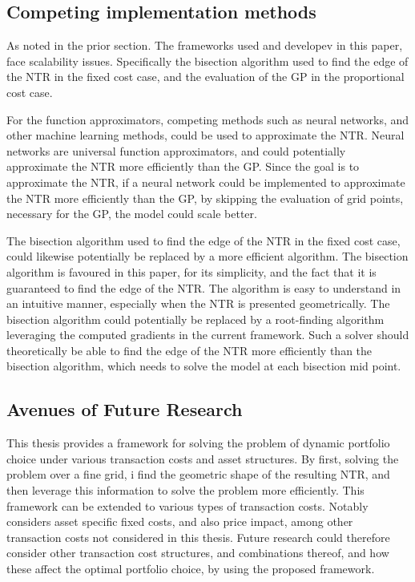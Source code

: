 \documentclass[11pt]{article}
\begin{document}
\subsection{Competing implementation methods} \label{Subsection: Competing solution methods}
As noted in the prior section. The frameworks used and developev in this paper, face scalability issues.
Specifically the bisection algorithm used to find the edge of the \ac{NTR} in the fixed cost case, and the evaluation of the \ac{GP} in the proportional cost case.

For the function approximators, competing methods such as neural networks, and other machine learning methods, could be used to approximate the \ac{NTR}.
Neural networks are universal function approximators, and could potentially approximate the \ac{NTR} more efficiently than the \ac{GP}.
Since the goal is to approximate the \ac{NTR}, if a neural network could be implemented to approximate the \ac{NTR} more efficiently than the \ac{GP},
by skipping the evaluation of grid points, necessary for the \ac{GP}, the model could scale better.

The bisection algorithm used to find the edge of the \ac{NTR} in the fixed cost case, could likewise potentially be replaced by a more efficient algorithm.
The bisection algorithm is favoured in this paper, for its simplicity, and the fact that it is guaranteed to find the edge of the \ac{NTR}.
The algorithm is easy to understand in an intuitive manner, especially when the \ac{NTR} is presented geometrically.
The bisection algorithm could potentially be replaced by a root-finding algorithm leveraging the computed gradients in the current framework.
Such a solver should theoretically be able to find the edge of the \ac{NTR} more efficiently than the bisection algorithm, which needs to solve the model at each bisection mid point. 
\subsection{Avenues of Future Research} \label{Subsection: Future Research}
This thesis provides a framework for solving the problem of dynamic portfolio choice under various transaction costs and asset structures.
By first, solving the problem over a fine grid, i find the geometric shape of the resulting \ac{NTR}, and then leverage this information to solve the problem more efficiently.
This framework can be extended to various types of transaction costs. Notably \autocite{Dybvig2020} considers asset specific fixed costs, and also price impact,
among other transaction costs not considered in this thesis. Future research could therefore consider other transaction cost structures, and combinations thereof,
and how these affect the optimal portfolio choice, by using the proposed framework.
\end{document}

